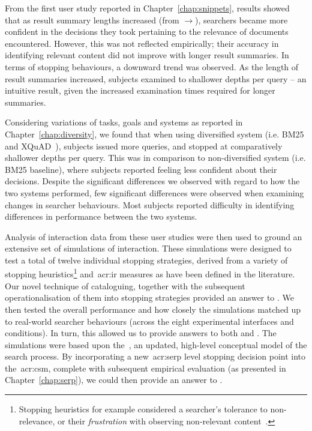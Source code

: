 From the first user study reported in Chapter~\ref{chap:snippets}, results showed that as result summary lengths increased (from $\rightarrow$), searchers became more confident in the decisions they took pertaining to the relevance of documents encountered. However, this was not reflected empirically; their accuracy in identifying relevant content did not improve with longer result summaries. In terms of stopping behaviours, a downward trend was observed. As the length of result summaries increased, subjects examined to shallower depths per query -- an intuitive result, given the increased examination times required for longer summaries.

Considering variations of tasks, goals and systems as reported in Chapter~\ref{chap:diversity}, we found that when using diversified system  (i.e. BM25 and XQuAD~\citep{santos2010query_reformulations_diversification}), subjects issued more queries, and stopped at comparatively shallower depths per query. This was in comparison to non-diversified system  (i.e. BM25 baseline), where subjects reported feeling less confident about their decisions. Despite the significant differences we observed with regard to how the two systems performed, few significant differences were observed when examining changes in searcher behaviours. Most subjects reported difficulty in identifying differences in performance between the two systems.

Analysis of interaction data from these user studies were then used to ground an extensive set of simulations of interaction. These simulations were designed to test a total of twelve individual stopping strategies, derived from a variety of stopping heuristics\footnote{Stopping heuristics for example considered a searcher's tolerance to non-relevance, or their \emph{frustration} with observing non-relevant content~\citep{kraft1979stopping_rules}.} and~\gls{acr:ir} measures as have been defined in the literature. Our novel technique of cataloguing, together with the subsequent operationalisation of them into stopping strategies provided an answer to . We then tested the overall performance and how closely the simulations matched up to real-world searcher behaviours (across the eight experimental interfaces and conditions). In turn, this allowed us to provide answers to both  and . The simulations were based upon the~, an updated, high-level conceptual model of the search process. By incorporating a new~\gls{acr:serp} level stopping decision point into the~\gls{acr:csm}, complete with subsequent empirical evaluation (as presented in Chapter~\ref{chap:serp}), we could then provide an answer to .

